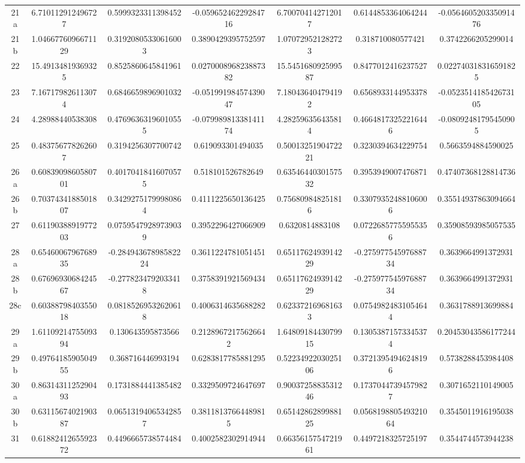 \begin{table}
\begin{tabular}{ccccccc}
21a & 6.710112912496727 & 0.5999323311398452 & -0.05965246229284716 & 6.700704142712017 & 0.6144853364064244 & -0.056460520335091476 \\
21b & 1.0466776096671129 & 0.31920805330616003 & 0.3890429395752597 & 1.070729521282723 & 0.318710080577421 & 0.3742266205299014 \\
22 & 15.49134819369325 & 0.8525860645841961 & 0.027000896823887382 & 15.545168092599587 & 0.8477012416237527 & 0.022740318316591825 \\
23 & 7.167179826113074 & 0.6846659896901032 & -0.05199198457439047 & 7.180436404794192 & 0.6568933144953378 & -0.052351418542673105 \\
24 & 4.28988440538308 & 0.47696363196010555 & -0.07998981338141174 & 4.282596356435814 & 0.46648173252216446 & -0.08092481795450905 \\
25 & 0.483756778262607 & 0.3194256307700742 & 0.619093301494035 & 0.5001325190472221 & 0.3230394634229754 & 0.5663594884590025 \\
26a & 0.6083909860580701 & 0.40170418416070575 & 0.518101526782649 & 0.6354644030157532 & 0.3953949007476871 & 0.47407368128814736 \\
26b & 0.7037434188501807 & 0.34292751799980864 & 0.4111225650136425 & 0.756809848251816 & 0.33079352488106006 & 0.35514937863094664 \\
27 & 0.6119038891977203 & 0.07595479289739039 & 0.3952296427066909 & 0.6320814883108 & 0.07226857755955356 & 0.35908593985057535 \\
28a & 0.6546006796768935 & -0.28494367898582224 & 0.3611224781051451 & 0.6511762493914229 & -0.27597754597688734 & 0.3639664991372931 \\
28b & 0.6769693068424567 & -0.2778234792033418 & 0.3758391921569434 & 0.6511762493914229 & -0.27597754597688734 & 0.3639664991372931 \\
28c & 0.6038879840355018 & 0.08185269532620618 & 0.4006314635688282 & 0.623372169681633 & 0.07549824831054644 & 0.3631788913699884 \\
29a & 1.6110921475509394 & 0.130643595873566 & 0.21289672175626642 & 1.6480918443079915 & 0.13053871573345374 & 0.20453043586177244 \\
29b & 0.4976418590504955 & 0.368716446993194 & 0.6283817785881295 & 0.5223492203025106 & 0.37213954946248196 & 0.5738288453984408 \\
30a & 0.8631431125290493 & 0.1731884441385482 & 0.3329509724647697 & 0.9003725883531246 & 0.17370447394579827 & 0.3071652110149005 \\
30b & 0.6311567402190387 & 0.06513194065342857 & 0.38118137664489815 & 0.6514286289988125 & 0.056819880549321064 & 0.3545011916195038 \\
31 & 0.6188241265592372 & 0.4496665738574484 & 0.4002582302914944 & 0.6635615754721961 & 0.4497218325725197 & 0.3544744573944238 \\
\end{tabular}
\end{table}
